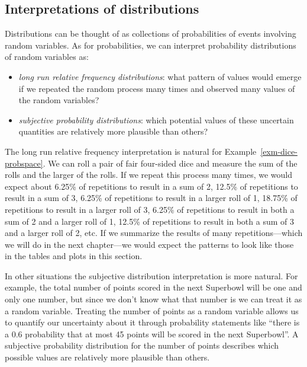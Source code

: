 \documentclass[
  letterpaper,
  DIV=11,
  numbers=noendperiod]{scrreprt}
\providecommand{\tightlist}{%
  \setlength{\itemsep}{0pt}\setlength{\parskip}{0pt}}
\theoremstyle{plain}
\theoremstyle{definition}
\theoremstyle{definition}
\theoremstyle{definition}
\theoremstyle{remark}
\begin{document}
\subsection{Interpretations of
distributions}\label{interpretations-of-distributions}

Distributions can be thought of as collections of probabilities of
events involving random variables. As for probabilities, we can
interpret probability distributions of random variables as:

\begin{itemize}
\tightlist
\item
  \emph{long run relative frequency distributions}: what pattern of
  values would emerge if we repeated the random process many times and
  observed many values of the random variables?\\
\item
  \emph{subjective probability distributions}: which potential values of
  these uncertain quantities are relatively more plausible than others?
\end{itemize}

The long run relative frequency interpretation is natural for
Example~\ref{exm-dice-probspace}. We can roll a pair of fair four-sided
dice and measure the sum of the rolls and the larger of the rolls. If we
repeat this process many times, we would expect about 6.25\% of
repetitions to result in a sum of 2, 12.5\% of repetitions to result in
a sum of 3, 6.25\% of repetitions to result in a larger roll of 1,
18.75\% of repetitions to result in a larger roll of 3, 6.25\% of
repetitions to result in both a sum of 2 and a larger roll of 1, 12.5\%
of repetitions to result in both a sum of 3 and a larger roll of 2, etc.
If we summarize the results of many repetitions---which we will do in
the next chapter---we would expect the patterns to look like those in
the tables and plots in this section.

In other situations the subjective distribution interpretation is more
natural. For example, the total number of points scored in the next
Superbowl will be one and only one number, but since we don't know what
that number is we can treat it as a random variable. Treating the number
of points as a random variable allows us to quantify our uncertainty
about it through probability statements like ``there is a 0.6
probability that at most 45 points will be scored in the next
Superbowl''. A subjective probability distribution for the number of
points describes which possible values are relatively more plausible
than others.
\end{document}
